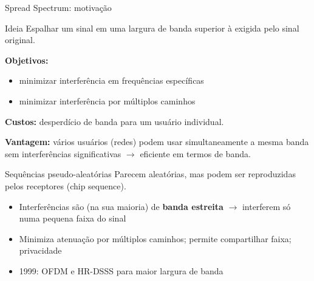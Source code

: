 \documentclass[aspectratio=169,11pt]{beamer}
\begin{document}
\begin{frame}{Spread Spectrum: motivação}
  \begin{block}{Ideia}
    Espalhar um sinal em uma largura de banda superior à exigida pelo sinal original.
  \end{block}
  \textbf{Objetivos:}
  \begin{itemize}
    \item minimizar interferência em frequências específicas
    \item minimizar interferência por múltiplos caminhos
  \end{itemize}
  \textbf{Custos:} desperdício de banda para um usuário individual.

  \textbf{Vantagem:} vários usuários (redes) podem usar simultaneamente a mesma banda sem interferências significativas $\rightarrow$ eficiente em termos de banda.
  \begin{block}{Sequências pseudo-aleatórias}
    Parecem aleatórias, mas podem ser reproduzidas pelos receptores (chip sequence).
  \end{block}
  \begin{itemize}
    \item Interferências são (na sua maioria) de \textbf{banda estreita} $\rightarrow$ interferem só numa pequena faixa do sinal
    \item Minimiza atenuação por múltiplos caminhos; permite compartilhar faixa; privacidade
    \item 1999: OFDM e HR-DSSS para maior largura de banda
  \end{itemize}
\end{frame}
\end{document}
